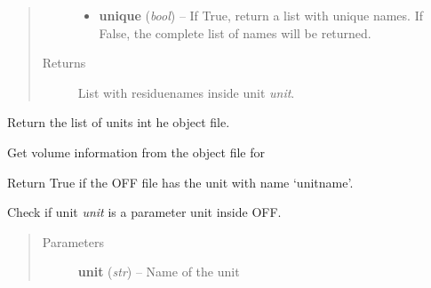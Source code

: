 \documentclass[letterpaper,10pt,english]{sphinxmanual}
\begin{document}
\begin{fulllineitems}
\begin{fulllineitems}
\begin{quote}
\begin{description}
\begin{itemize}
\item {} 
\textbf{unique} (\emph{bool}) -- If True, return a list with unique names. If False, the complete list of names will
be returned.

\end{itemize}

\item[{Returns}] \leavevmode
List with residuenames inside unit \emph{unit}.

\end{description}\end{quote}

\end{fulllineitems}


\begin{fulllineitems}
\label{OFFManager:pyMDMix.OFFManager.OFFManager.getUnits}
Return the list of units int he object file.

\end{fulllineitems}


\begin{fulllineitems}
\label{OFFManager:pyMDMix.OFFManager.OFFManager.getVolume}
Get volume information from the object file for 

\end{fulllineitems}


\begin{fulllineitems}
\label{OFFManager:pyMDMix.OFFManager.OFFManager.hasUnit}
Return True if the OFF file has the unit with name `unitname'.

\end{fulllineitems}


\begin{fulllineitems}
\label{OFFManager:pyMDMix.OFFManager.OFFManager.isParameter}
Check if unit \emph{unit} is a parameter unit inside OFF.
\begin{quote}\begin{description}
\item[{Parameters}] \leavevmode
\textbf{unit} (\emph{str}) -- Name of the unit


\end{description}
\end{quote}
\end{fulllineitems}
\end{fulllineitems}
\end{document}
